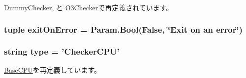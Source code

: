 \hyperlink{classDummyChecker_1_1DummyChecker_a17da7064bc5c518791f0c891eff05fda}{DummyChecker}, と \hyperlink{classO3Checker_1_1O3Checker_a17da7064bc5c518791f0c891eff05fda}{O3Checker}で再定義されています。\hypertarget{classCheckerCPU_1_1CheckerCPU_ae3f9ab8da88c7ebfba47692201291bed}{
\subsubsection[{exitOnError}]{\setlength{\rightskip}{0pt plus 5cm}tuple {\bf exitOnError} = Param.Bool(False, \char`\"{}Exit on an error\char`\"{})}}
\label{classCheckerCPU_1_1CheckerCPU_ae3f9ab8da88c7ebfba47692201291bed}
\hypertarget{classCheckerCPU_1_1CheckerCPU_acce15679d830831b0bbe8ebc2a60b2ca}{
\subsubsection[{type}]{\setlength{\rightskip}{0pt plus 5cm}string {\bf type} = '{\bf CheckerCPU}'}}
\label{classCheckerCPU_1_1CheckerCPU_acce15679d830831b0bbe8ebc2a60b2ca}


\hyperlink{classBaseCPU_1_1BaseCPU_acce15679d830831b0bbe8ebc2a60b2ca}{BaseCPU}を再定義しています。

